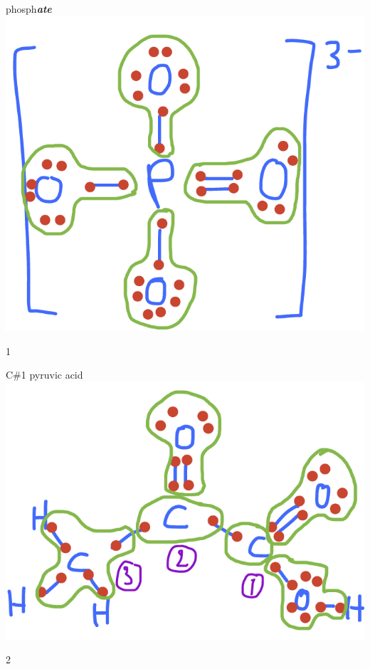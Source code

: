 \documentclass[]{book}
\theoremstyle{definition}
\theoremstyle{definition}
\theoremstyle{definition}
\theoremstyle{remark}
\begin{document}
phosph\emph{\textbf{ate}}~\includegraphics{pictures/ElecAlloc_PO43-.png}

1

C\#1 pyruvic acid~\includegraphics{pictures/ElecAlloc_pyruvic_acid.png}

2
\end{document}
